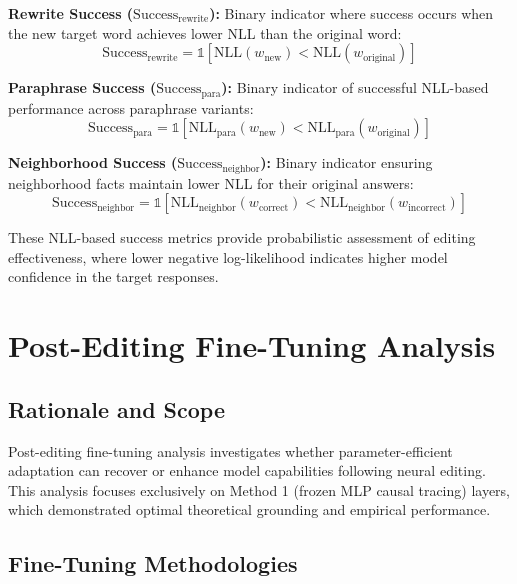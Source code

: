 \textbf{Rewrite Success ($\text{Success}_{\text{rewrite}}$):}
Binary indicator where success occurs when the new target word achieves lower NLL than the original word:
\begin{equation}
\text{Success}_{\text{rewrite}} = \mathbb{1}[\text{NLL}(w_{\text{new}}) < \text{NLL}(w_{\text{original}})]
\end{equation}

\textbf{Paraphrase Success ($\text{Success}_{\text{para}}$):}
Binary indicator of successful NLL-based performance across paraphrase variants:
\begin{equation}
\text{Success}_{\text{para}} = \mathbb{1}[\text{NLL}_{\text{para}}(w_{\text{new}}) < \text{NLL}_{\text{para}}(w_{\text{original}})]
\end{equation}

\textbf{Neighborhood Success ($\text{Success}_{\text{neighbor}}$):}
Binary indicator ensuring neighborhood facts maintain lower NLL for their original answers:
\begin{equation}
\text{Success}_{\text{neighbor}} = \mathbb{1}[\text{NLL}_{\text{neighbor}}(w_{\text{correct}}) < \text{NLL}_{\text{neighbor}}(w_{\text{incorrect}})]
\end{equation}

These NLL-based success metrics provide probabilistic assessment of editing effectiveness, where lower negative log-likelihood indicates higher model confidence in the target responses.

\section{Post-Editing Fine-Tuning Analysis}

\subsection{Rationale and Scope}

Post-editing fine-tuning analysis investigates whether parameter-efficient adaptation can recover or enhance model capabilities following neural editing. This analysis focuses exclusively on Method 1 (frozen MLP causal tracing) layers, which demonstrated optimal theoretical grounding and empirical performance.

\subsection{Fine-Tuning Methodologies}

